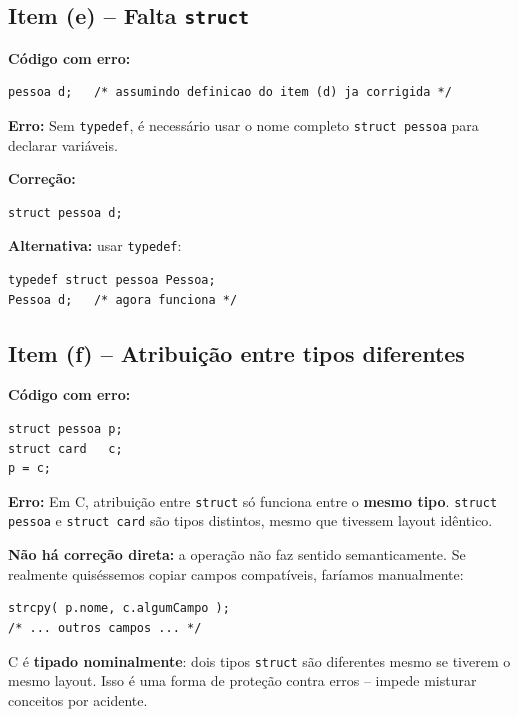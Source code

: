 \documentclass[12pt,a4paper]{article}
\begin{document}
\subsection*{Item (e) -- Falta \texttt{struct}}
\begin{respostabox}
\textbf{Código com erro:}
\begin{lstlisting}
pessoa d;   /* assumindo definicao do item (d) ja corrigida */
\end{lstlisting}

\textbf{Erro:} Sem \texttt{typedef}, é necessário usar o nome completo
\texttt{struct pessoa} para declarar variáveis.

\textbf{Correção:}
\begin{lstlisting}
struct pessoa d;
\end{lstlisting}

\textbf{Alternativa:} usar \texttt{typedef}:
\begin{lstlisting}
typedef struct pessoa Pessoa;
Pessoa d;   /* agora funciona */
\end{lstlisting}
\end{respostabox}

\subsection*{Item (f) -- Atribuição entre tipos diferentes}
\begin{respostabox}
\textbf{Código com erro:}
\begin{lstlisting}
struct pessoa p;
struct card   c;
p = c;
\end{lstlisting}

\textbf{Erro:} Em C, atribuição entre \texttt{struct} só funciona entre o
\textbf{mesmo tipo}. \texttt{struct pessoa} e \texttt{struct card} são tipos
distintos, mesmo que tivessem layout idêntico.

\textbf{Não há correção direta:} a operação não faz sentido semanticamente.
Se realmente quiséssemos copiar campos compatíveis, faríamos manualmente:
\begin{lstlisting}
strcpy( p.nome, c.algumCampo );
/* ... outros campos ... */
\end{lstlisting}

\begin{boaprática}
  C é \textbf{tipado nominalmente}: dois tipos \texttt{struct} são diferentes
  mesmo se tiverem o mesmo layout. Isso é uma forma de proteção contra erros
  -- impede misturar conceitos por acidente.
\end{boaprática}
\end{respostabox}
\end{document}
